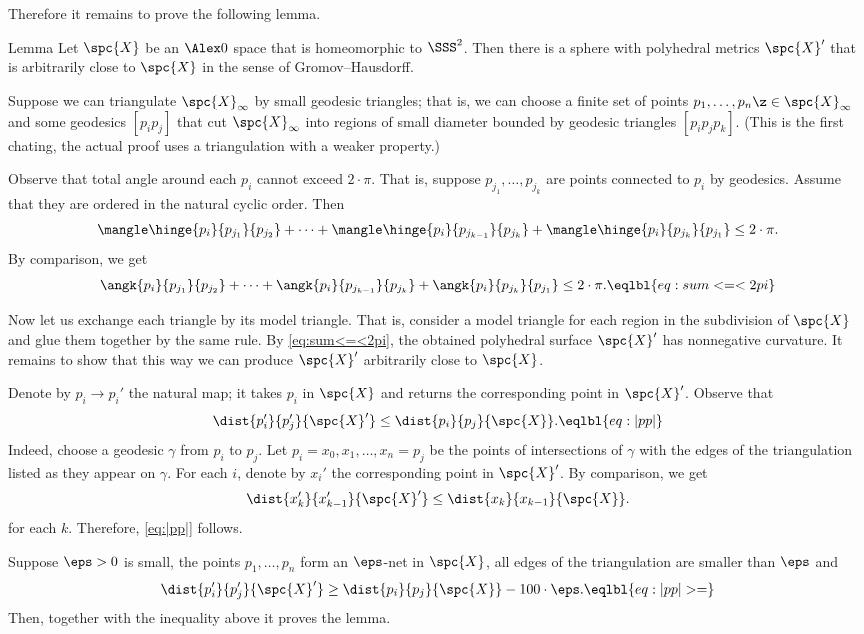 Therefore it remains to prove the following lemma.

\begin{thm}{Lemma}\label{lem:GH-approximation}
Let $\spc{X}$ be an $\Alex0$ space that is homeomorphic to $\SSS^2$.
Then there is a sphere with polyhedral metrics $\spc{X}'$
that is arbitrarily close to $\spc{X}$ in the sense of Gromov--Hausdorff.
\end{thm}

Suppose we can triangulate $\spc{X}_\infty$ by small geodesic triangles;
that is, we can choose a finite set of points $p_1,\dots,p_n\z\in \spc{X}_\infty$ and some geodesics $[p_ip_j]$ that cut $\spc{X}_\infty$ into regions of small diameter bounded by geodesic triangles $[p_ip_jp_k]$.
(This is the first chating, the actual proof uses a triangulation with a weaker property.)

Observe that total angle around each $p_i$ cannot exceed $2\cdot \pi$.
That is, suppose $p_{j_1},\dots,p_{j_k}$ are points connected to $p_i$ by geodesics.
Assume that they are ordered in the natural cyclic order.
Then
\[\mangle\hinge{p_i}{p_{j_1}}{p_{j_2}}+\dots+\mangle\hinge{p_i}{p_{j_{k-1}}}{p_{j_k}}+\mangle\hinge{p_i}{p_{j_{k}}}{p_{j_1}}\le 2\cdot\pi.\]
By comparison, we get
\[\angk{p_i}{p_{j_1}}{p_{j_2}}+\dots+
\angk{p_i}{p_{j_{k-1}}}{p_{j_k}}+\angk{p_i}{p_{j_{k}}}{p_{j_1}}\le 2\cdot\pi.\eqlbl{eq:sum<=<2pi}\]

Now let us exchange each triangle by its model triangle.
That is, consider a model triangle for each region in the subdivision of $\spc{X}$ and glue them together by the same rule.
By \ref{eq:sum<=<2pi}, the obtained polyhedral surface $\spc{X}'$ has nonnegative curvature.
It remains to show that this way we can produce $\spc{X}'$ arbitrarily close to $\spc{X}$.

Denote by $p_i\to p_i'$ the natural map; it takes $p_i$ in $\spc{X}$ and returns the corresponding point in $\spc{X}'$.
Observe that
\[\dist{p_i'}{p_j'}{\spc{X}'}
\le
\dist{p_i}{p_j}{\spc{X}}.\eqlbl{eq:|pp|}\]
Indeed, choose a geodesic $\gamma$ from $p_i$ to $p_j$.
Let $p_i=x_0,x_1,\dots,x_n=p_j$ be the points of intersections of $\gamma$ with the edges of the triangulation listed as they appear on $\gamma$.
For each $i$, denote by $x_i'$ the corresponding point in $\spc{X}'$.
By comparison, we get
\[\dist{x_k'}{x_{k-1}'}{\spc{X}'}
\le
\dist{x_k}{x_{k-1}}{\spc{X}}.\]
for each $k$.
Therefore, \ref{eq:|pp|} follows.

Suppose $\eps>0$ is small, the points $p_1,\dots,p_n$ form an $\eps$-net in $\spc{X}$, all edges of the triangulation are smaller than $\eps$ and
\[\dist{p_i'}{p_j'}{\spc{X}'}
\ge
\dist{p_i}{p_j}{\spc{X}} -100\cdot \eps.\eqlbl{eq:|pp|>=}\]
Then, together with the inequality above it proves the lemma.

